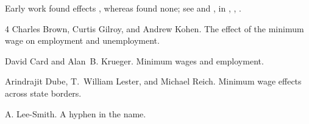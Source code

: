 \documentclass{article}
\begin{document}
Early work found effects \citep{brown1982}, whereas \citet{card1994} found none; see \citep[see][p.~2]{card1994,dube2010}
and \citet[p.~950]{dube2010}, \citeauthor{dube2010} in \citeyear{dube2010}, \citealp{brown1982,nokey}, \citet{leesmith}.

\begin{thebibliography}{4}
Charles Brown, Curtis Gilroy, and Andrew Kohen.
\newblock The effect of the minimum wage on employment and unemployment.

David Card and Alan~B. Krueger.
\newblock Minimum wages and employment.

Arindrajit Dube, T.~William Lester, and Michael Reich.
\newblock Minimum wage effects across state borders.

A. Lee-Smith.
\newblock A hyphen in the name.
\end{thebibliography}
\end{document}
